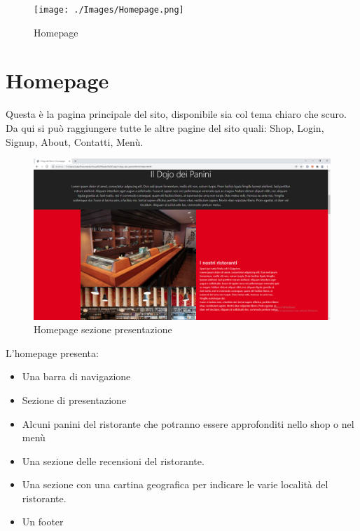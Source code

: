 \documentclass[a4paper,12pt]{report}
\begin{document}
	\begin{figure}[ht] 
		\centering
		\texttt{[image: ./Images/Homepage.png]}
		\caption{Homepage}
		\label{fig:homepage}
	\end{figure}

	
	\newpage
	
	
	\section{Homepage}
	
	\textsf{\small Questa è la pagina principale del sito, disponibile sia col tema chiaro che scuro. Da qui si può raggiungere tutte le altre pagine del sito quali: Shop, Login, Signup, About, Contatti, Menù.}\\
	
	\begin{figure}[ht] 
		\centering
		\includegraphics[width=1\textwidth, height=1\textheight, keepaspectratio]{./Images/Homepage_presentazione.png}
		\caption{Homepage sezione presentazione}
		\label{fig:homepage_presentazione}
	\end{figure}
	
	\textsf{\small L'homepage presenta: }
	
	\begin{itemize}
		\item \textsf{\small Una barra di navigazione}
		\item \textsf{\small Sezione di presentazione}
		\item \textsf{\small Alcuni panini del ristorante che potranno essere approfonditi nello shop o nel menù}
		\item \textsf{\small Una sezione delle recensioni del ristorante.}
		\item \textsf{\small Una sezione con una cartina geografica per indicare le varie località del ristorante.}
		\item \textsf{\small Un footer}
	\end{itemize}
\end{document}
